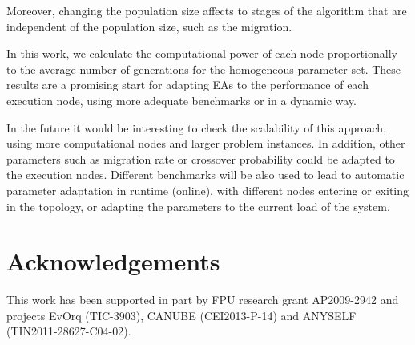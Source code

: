\documentclass[final,1p,times]{elsarticle}
\begin{document}
Moreover, changing the population size affects to stages
of the algorithm that are independent of the population size, such as
the migration. 

In this work, we calculate the computational power of each node proportionally 
to the average number of generations for the homogeneous parameter set. These results are a promising start for adapting EAs to the
performance of each execution node, using more adequate benchmarks or in a dynamic way. 

In the future it would be interesting to check the scalability of this
approach, using more computational nodes and larger problem
instances. In addition, other parameters such as migration rate or
crossover probability could be adapted to the execution
nodes. Different benchmarks will be also used to lead to automatic
parameter adaptation in runtime (online), with different nodes entering or
exiting in the topology, or adapting the parameters to the current load of the
system. 

\section*{Acknowledgements}
This work has been supported in part by FPU research grant AP2009-2942 and projects EvOrq (TIC-3903), CANUBE (CEI2013-P-14) and ANYSELF (TIN2011-28627-C04-02).




%
%









\end{document}
